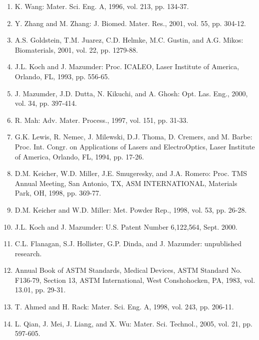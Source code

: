 \documentclass[10pt]{article}
\begin{document}
\begin{enumerate}
  \item K. Wang: Mater. Sci. Eng. A, 1996, vol. 213, pp. 134-37.

  \item Y. Zhang and M. Zhang: J. Biomed. Mater. Res., 2001, vol. 55, pp. 304-12.

  \item A.S. Goldstein, T.M. Juarez, C.D. Helmke, M.C. Gustin, and A.G. Mikos: Biomaterials, 2001, vol. 22, pp. 1279-88.

  \item J.L. Koch and J. Mazumder: Proc. ICALEO, Laser Institute of America, Orlando, FL, 1993, pp. 556-65.

  \item J. Mazumder, J.D. Dutta, N. Kikuchi, and A. Ghosh: Opt. Las. Eng., 2000, vol. 34, pp. 397-414.

  \item R. Mah: Adv. Mater. Process., 1997, vol. 151, pp. 31-33.

  \item G.K. Lewis, R. Nemec, J. Milewski, D.J. Thoma, D. Cremers, and M. Barbe: Proc. Int. Congr. on Applications of Lasers and ElectroOptics, Laser Institute of America, Orlando, FL, 1994, pp. 17-26.

  \item D.M. Keicher, W.D. Miller, J.E. Smugeresky, and J.A. Romero: Proc. TMS Annual Meeting, San Antonio, TX, ASM INTERNATIONAL, Materials Park, OH, 1998, pp. 369-77.

  \item D.M. Keicher and W.D. Miller: Met. Powder Rep., 1998, vol. 53, pp. 26-28.

  \item J.L. Koch and J. Mazumder: U.S. Patent Number 6,122,564, Sept. 2000.

  \item C.L. Flanagan, S.J. Hollister, G.P. Dinda, and J. Mazumder: unpublished research.

  \item Annual Book of ASTM Standards, Medical Devices, ASTM Standard No. F136-79, Section 13, ASTM International, West Conshohocken, PA, 1983, vol. 13.01, pp. 29-31.

  \item T. Ahmed and H. Rack: Mater. Sci. Eng. A, 1998, vol. 243, pp. 206-11.

  \item L. Qian, J. Mei, J. Liang, and X. Wu: Mater. Sci. Technol., 2005, vol. 21, pp. 597-605.


\end{enumerate}
\end{document}
